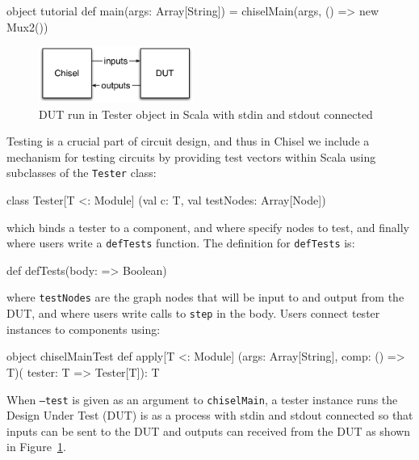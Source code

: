 \documentclass[twocolumn,10pt]{article}
\def\code#1{{\tt #1}}
\begin{document}
\begin{scala}
object tutorial {
  def main(args: Array[String]) = {
    chiselMain(args, () => new Mux2())
  }
}
\end{scala}

\begin{figure}
\begin{center}
\includegraphics[width=0.45\textwidth]{../tutorial/figs/DUT.pdf}
\end{center}
\caption{DUT run in Tester object in Scala with stdin and stdout connected}
\label{fig:dut}
\end{figure}
 
Testing is a crucial part of circuit design, 
and thus in Chisel we include a mechanism for
testing circuits by providing test vectors within Scala using
subclasses of the \code{Tester} class:

\begin{scala}
class Tester[T <: Module]
  (val c: T, val testNodes: Array[Node])
\end{scala}

\noindent
which binds a tester to a component, and where specify nodes to test,
and finally where users write a \code{defTests} function.
The definition for \code{defTests} is:

\begin{scala}
def defTests(body: => Boolean)
\end{scala}

\noindent
where \code{testNodes} are the graph nodes that will be input to and
output from the DUT, and where
users write calls to \code{step} in the body.  Users connect tester
instances to components using:

\begin{scala}
object chiselMainTest {
  def apply[T <: Module]
    (args: Array[String], comp: () => T)(
     tester: T => Tester[T]): T
}
\end{scala}

\noindent
When \code{--test} is given as an argument to \code{chiselMain}, 
a tester instance runs the Design Under Test (DUT) is as a process
with stdin and stdout connected so that inputs can be sent to the DUT and outputs can
received from the DUT as shown in Figure~\ref{fig:dut}.  
\noindent
\end{document}
